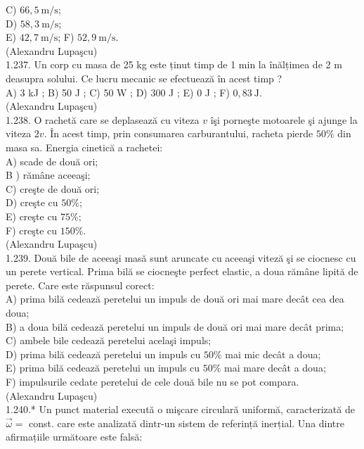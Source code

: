 \documentclass[10pt]{article}
\begin{document}
\begin{itemize}
{C) $66,5 \mathrm{~m} / \mathrm{s}$;\\
D) $58,3 \mathrm{~m} / \mathrm{s}$;\\
E) $42,7 \mathrm{~m} / \mathrm{s}$; F) $52,9 \mathrm{~m} / \mathrm{s}$.\\
(Alexandru Lupaşcu)\\
1.237. Un corp cu masa de 25 kg este ținut timp de 1 min la înălțimea de 2 m deasupra solului. Ce lucru mecanic se efectuează în acest timp ?\\
A) 3 kJ ; B) 50 J ; C) 50 W ; D) 300 J ; E) 0 J ; F) $0,83 \mathrm{~J}$.\\
(Alexandru Lupaşcu)\\
1.238. O rachetă care se deplasează cu viteza $v$ îşi porneşte motoarele şi ajunge la viteza $2 v$. În acest timp, prin consumarea carburantului, racheta pierde $50 \%$ din masa sa. Energia cinetică a rachetei:\\
A) scade de două ori;\\
B ) rămâne aceeaşi;\\
C) creşte de două ori;\\
D) creşte cu $50 \%$;\\
E) creşte cu $75 \%$;\\
F) creşte cu $150 \%$.\\
(Alexandru Lupaşcu)\\
1.239.} Două bile de aceeaşi masă sunt aruncate cu aceeaşi viteză şi se ciocnesc cu un perete vertical. Prima bilă se ciocneşte perfect elastic, a doua rămâne lipită de perete. Care este răspunsul corect:\\
A) prima bilă cedează peretelui un impuls de două ori mai mare decât cea dea doua;\\
B) a doua bilă cedează peretelui un impuls de două ori mai mare decât prima;\\
C) ambele bile cedează peretelui acelaşi impuls;\\
D) prima bilă cedează peretelui un impuls cu $50 \%$ mai mic decât a doua;\\
E) prima bilă cedează peretelui un impuls cu $50 \%$ mai mare decât a doua;\\
F) impulsurile cedate peretelui de cele două bile nu se pot compara.\\
(Alexandru Lupaşcu)\\
1.240.* Un punct material execută o mişcare circulară uniformă, caracterizată de $\vec{\omega}=$ const. care este analizată dintr-un sistem de referință inerțial. Una dintre afirmațiile următoare este falsă:\\

\end{itemize}
\end{document}

